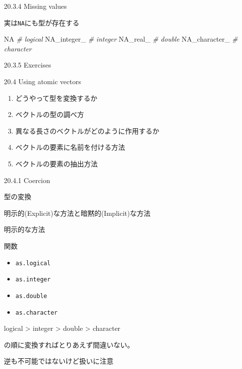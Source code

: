 \documentclass[ignorenonframetext,]{beamer}
\newenvironment{Shaded}{\begin{snugshade}}{\end{snugshade}}
\newcommand{\CommentTok}[1]{\textcolor[rgb]{0.56,0.35,0.01}{\textit{#1}}}
\newcommand{\OtherTok}[1]{\textcolor[rgb]{0.56,0.35,0.01}{#1}}
\providecommand{\tightlist}{%
  \setlength{\itemsep}{0pt}\setlength{\parskip}{0pt}}
\begin{document}
\begin{frame}[fragile]{20.3.4 Missing values}

実は\texttt{NA}にも型が存在する

\begin{Shaded}
\begin{Highlighting}[]
\OtherTok{NA}            \CommentTok{# logical}
\OtherTok{NA_integer_}   \CommentTok{# integer}
\OtherTok{NA_real_}      \CommentTok{# double}
\OtherTok{NA_character_} \CommentTok{# character}
\end{Highlighting}
\end{Shaded}

\end{frame}

\begin{frame}{20.3.5 Exercises}

\end{frame}

\begin{frame}{20.4 Using atomic vectors}

\begin{enumerate}
\def\labelenumi{\arabic{enumi}.}
\tightlist
\item
  どうやって型を変換するか
\item
  ベクトルの型の調べ方
\item
  異なる長さのベクトルがどのように作用するか
\item
  ベクトルの要素に名前を付ける方法
\item
  ベクトルの要素の抽出方法
\end{enumerate}

\end{frame}

\begin{frame}{20.4.1 Coercion}

型の変換

明示的(Explicit)な方法と暗黙的(Implicit)な方法

\end{frame}

\begin{frame}[fragile]{明示的な方法}

関数

\begin{itemize}
\tightlist
\item
  \texttt{as.logical}
\item
  \texttt{as.integer}
\item
  \texttt{as.double}
\item
  \texttt{as.character}
\end{itemize}

logical \textgreater{} integer \textgreater{} double \textgreater{}
character

の順に変換すればとりあえず間違いない。

逆も不可能ではないけど扱いに注意

\end{frame}
\end{document}
